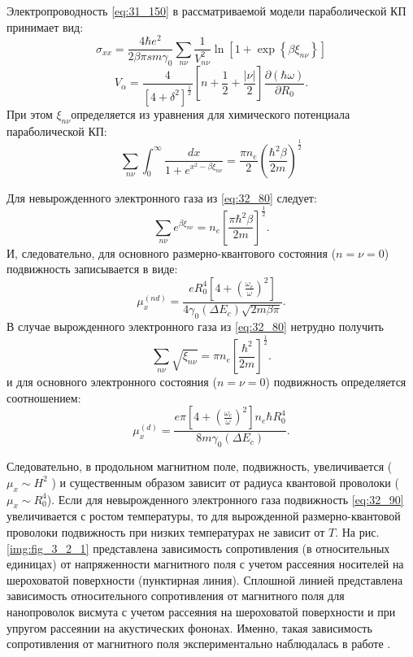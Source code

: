 Электропроводность \eqref{eq:31_150} в рассматриваемой модели параболической КП принимает вид:
\begin{equation} \label{eq:32_70}
\sigma _{xx} =\frac{4\hbar e^{2} }{2\beta \pi sm\gamma _{0} } \sum _{n\nu }\frac{1}{V_{n\nu }^{2} } \ln \left[1+\exp \left\{\beta \xi _{n\nu } \right\}\right]
\end{equation}
\[
V_{\alpha } =\frac{4}{\left[4+\delta ^{2} \right]^{\frac{1}{2} } } \left[n+\frac{1}{2} +\frac{\left|\nu \right|}{2} \right]\frac{\partial (\hbar \omega )}{\partial R_{0} } .
\] 
При этом $\xi _{n\nu } $определяется из уравнения для химического потенциала параболической КП:
\begin{equation} \label{eq:32_80}
\sum _{n\nu }\int _{0}^{\infty }\frac{dx}{1+e^{x^{2} -\beta \xi _{n\nu } } } =\frac{\pi n_{e} }{2} \left(\frac{\hbar ^{2} \beta }{2m} \right)^{\frac{1}{2} } 
\end{equation}

Для невырожденного электронного газа из \eqref{eq:32_80} следует:
\[
\sum _{n\nu }e^{\beta \xi _{n\nu } }  =n_{e} \left[\frac{\pi \hbar ^{2} \beta }{2m} \right]^{\frac{1}{2} } .
\] 
И, следовательно, для основного размерно-квантового состояния ($n=\nu =0$) подвижность записывается в виде:
\begin{equation} \label{eq:32_90}
\mu _{x}^{\left(nd\right)} =\frac{eR_{0}^{4} \left[4+\left(\frac{\omega _{c} }{\omega } \right)^{2} \right]}{4\gamma _{0} \left(\Delta E_{c} \right)\sqrt{2m\beta \pi } } . 
\end{equation}
В случае вырожденного электронного газа из \eqref{eq:32_80} нетрудно получить
\[
\sum _{n\nu }\sqrt{\xi _{n\nu } }  =\pi n_{e} \left[\frac{\hbar ^{2} }{2m} \right]^{\frac{1}{2} } .
\] 
и для основного электронного состояния ($n=\nu =0$) подвижность определяется соотношением:
\begin{equation} \label{eq:32_100}
\mu _{x}^{\left(d\right)} =\frac{e\pi \left[4+\left(\frac{\omega _{c} }{\omega } \right)^{2} \right]n_{e} \hbar R_{0}^{4} }{8m\gamma _{0} \left(\Delta E_{c} \right)} .
\end{equation}
 
Следовательно, в продольном магнитном поле, подвижность, увеличивается ($\mu _{x} \sim H^{2} $ ) и существенным образом зависит от радиуса квантовой проволоки ($\mu _{x} \sim R_{0}^{4} $). Если для невырожденного электронного газа  подвижность \eqref{eq:32_90} увеличивается с ростом температуры, то для вырожденной размерно-квантовой проволоки подвижность при низких температурах не зависит от $T$. На рис. \ref{img:fig_3_2_1} представлена зависимость сопротивления (в относительных единицах) от напряженности магнитного поля с учетом рассеяния носителей на шероховатой поверхности (пунктирная линия). Сплошной линией представлена зависимость относительного сопротивления от магнитного поля для нанопроволок висмута с учетом рассеяния на шероховатой поверхности и при упругом рассеянии на акустических фононах. Именно, такая зависимость сопротивления от магнитного поля экспериментально наблюдалась в работе \cite{Nikolaeva2004}.

